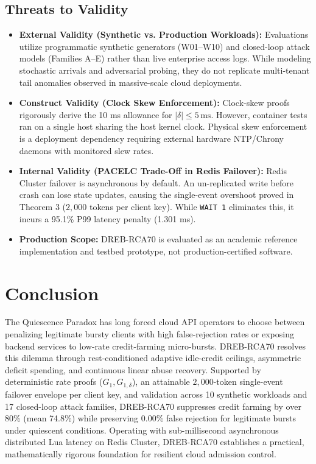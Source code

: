 \documentclass[conference]{IEEEtran}
\begin{document}
\subsection{Threats to Validity}
\begin{itemize}
    \item \textbf{External Validity (Synthetic vs. Production Workloads):} Evaluations utilize programmatic synthetic generators (W01--W10) and closed-loop attack models (Families A--E) rather than live enterprise access logs. While modeling stochastic arrivals and adversarial probing, they do not replicate multi-tenant tail anomalies observed in massive-scale cloud deployments.
    \item \textbf{Construct Validity (Clock Skew Enforcement):} Clock-skew proofs rigorously derive the 10 ms allowance for $|\delta| \le 5\,\text{ms}$. However, container tests ran on a single host sharing the host kernel clock. Physical skew enforcement is a deployment dependency requiring external hardware NTP/Chrony daemons with monitored slew rates.
    \item \textbf{Internal Validity (PACELC Trade-Off in Redis Failover):} Redis Cluster failover is asynchronous by default. An un-replicated write before crash can lose state updates, causing the single-event overshoot proved in Theorem 3 ($2,000$ tokens per client key). While \texttt{WAIT 1} eliminates this, it incurs a 95.1\% P99 latency penalty (1.301 ms).
    \item \textbf{Production Scope:} DREB-RCA70 is evaluated as an academic reference implementation and testbed prototype, not production-certified software.
\end{itemize}

\section{Conclusion}

The Quiescence Paradox has long forced cloud API operators to choose between penalizing legitimate bursty clients with high false-rejection rates or exposing backend services to low-rate credit-farming micro-bursts. DREB-RCA70 resolves this dilemma through rest-conditioned adaptive idle-credit ceilings, asymmetric deficit spending, and continuous linear abuse recovery. Supported by deterministic rate proofs ($G_1, G_{1,\delta}$), an attainable $2,000$-token single-event failover envelope per client key, and validation across 10 synthetic workloads and 17 closed-loop attack families, DREB-RCA70 suppresses credit farming by over 80\% (mean 74.8\%) while preserving 0.00\% false rejection for legitimate bursts under quiescent conditions. Operating with sub-millisecond asynchronous distributed Lua latency on Redis Cluster, DREB-RCA70 establishes a practical, mathematically rigorous foundation for resilient cloud admission control.



\end{document}
